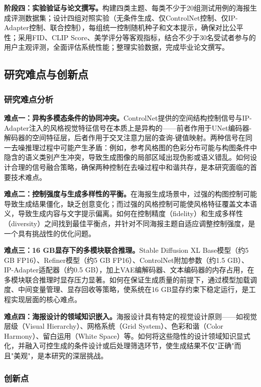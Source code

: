 \documentclass[12pt,a4paper]{ctexart}
\newcommand{\sdxl}{Stable Diffusion XL}
\newcommand{\controlnet}{ControlNet}
\newcommand{\ipadapter}{IP-Adapter}
\begin{document}
\noindent\textbf{阶段四：实验验证与论文撰写。}构建四类主题、每类不少于20组测试用例的海报生成评测数据集；设计四组对照实验（无条件生成、仅ControlNet控制、仅IP-Adapter控制、联合控制），每组统一控制随机种子和文本提示，确保对比公平性；采用FID、CLIP Score、美学评分等客观指标，结合不少于30名受试者参与的用户主观评测，全面评估系统性能；整理实验数据，完成毕业论文撰写。

\subsection{研究难点与创新点}

\subsubsection{研究难点分析}

\textbf{难点一：异构多模态条件的协同冲突。}\controlnet{}提供的空间结构控制信号与\ipadapter{}注入的风格视觉特征信号在本质上是异构的——前者作用于UNet编码器-解码器的空间特征层，后者作用于交叉注意力层的查询-键值映射。两种信号在同一去噪推理过程中可能产生矛盾：例如，参考风格图的色彩分布可能与构图条件中隐含的语义类别产生冲突，导致生成图像的局部区域出现伪影或语义错乱。如何设计合理的信号融合策略，确保两种控制在去噪过程中和谐共存，是本研究面临的首要技术难点。

\textbf{难点二：控制强度与生成多样性的平衡。}在海报生成场景中，过强的构图控制可能导致生成结果僵化，缺乏创意变化；而过强的风格控制可能使风格特征覆盖文本语义，导致生成内容与文字提示偏离。如何在控制精度（fidelity）和生成多样性（diversity）之间找到最佳平衡点，并针对不同海报主题自适应调整控制强度，是一个具有挑战性的优化问题。

\textbf{难点三：16 GB显存下的多模块联合推理。}\sdxl{} Base模型（约5 GB FP16）、Refiner模型（约5 GB FP16）、\controlnet{}附加参数（约1.5 GB）、\ipadapter{}适配器（约0.5 GB），加上VAE编解码器、文本编码器的内存占用，在多模块联合推理时显存压力显著。如何在保证生成质量的前提下，通过模型加载调度、中间变量管理、显存回收等策略，使系统在16 GB显存约束下稳定运行，是工程实现层面的核心难点。

\textbf{难点四：海报设计的领域知识嵌入。}海报设计具有特定的视觉设计原则——如视觉层级（Visual Hierarchy）、网格系统（Grid System）、色彩和谐（Color Harmony）、留白运用（White Space）等。如何将这些隐性的设计领域知识显式化，并融入可控生成的条件设计或后处理筛选环节，使生成结果不仅"正确"而且"美观"，是本研究的深层挑战。

\subsubsection{创新点}
\end{document}
